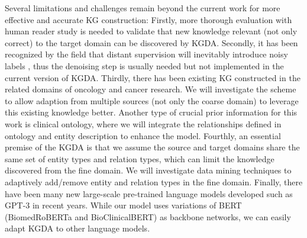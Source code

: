 \documentclass[sigconf]{acmart}
\begin{document}
Several limitations and challenges remain beyond the current work for more effective and accurate KG construction: Firstly, more thorough evaluation with human reader study is needed to validate that new knowledge relevant (not only correct) to the target domain can be discovered by KGDA. Secondly, it has been recognized by the field that distant supervision will inevitably introduce noisy labels \cite{liang2020bond,zhang2021readsre}, thus the denoising step is usually needed but not implemented in the current version of KGDA. Thirdly, there has been existing KG constructed in the related domains of oncology and cancer research. We will investigate the scheme to allow adaption from multiple sources (not only the coarse domain) to leverage this existing knowledge better. Another type of crucial prior information for this work is clinical ontology, where we will integrate the relationships defined in ontology and entity description to enhance the model. Fourthly, an essential premise of the KGDA is that we assume the source and target domains share the same set of entity types and relation types, which can limit the knowledge discovered from the fine domain. We will investigate data mining techniques to adaptively add/remove entity and relation types in the fine domain. Finally, there have been many new large-scale pre-trained language models developed such as GPT-3 in recent years. While our model uses variations of BERT (BiomedRoBERTa and BioClinicalBERT) as backbone networks, we can easily adapt KGDA to other language models.  



%   
%   



\end{document}
